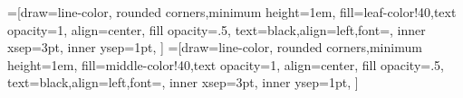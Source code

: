 =[draw=line-color,
    rounded corners,minimum height=1em,
    fill=leaf-color!40,text opacity=1, align=center,
    fill opacity=.5,  text=black,align=left,font=\scriptsize,
    inner xsep=3pt,
    inner ysep=1pt,
    ]
=[draw=line-color,
    rounded corners,minimum height=1em,
    fill=middle-color!40,text opacity=1, align=center,
    fill opacity=.5,  text=black,align=left,font=\scriptsize,
    inner xsep=3pt,
    inner ysep=1pt,
    ]
\begin{figure}[!ht]
\centering

\end{figure}
